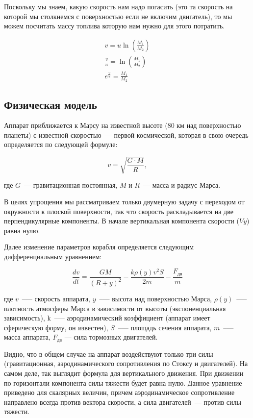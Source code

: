 \documentclass[12pt,a4paper]{article}
\begin{document}
Поскольку мы знаем, какую скорость нам надо погасить (это та скорость на которой мы
столкнемся с поверхностью если не включим двигатель), то мы можем посчитать массу топлива
которую нам нужно для этого потратить.

$$
\begin{array}{c}

  v = u \ln\left(\frac{M_1}{M_2}\right) \\
  \frac{v}{u} = \ln\left(\frac{M_1}{M_2}\right) \\
  e^{\frac{v}{u}} = \frac{M_1}{M_2}
\end{array}
$$

\hfill

\noindent{}

\subsection{Физическая модель}
\label{Sec:Mars-Model}

Аппарат приближается к Марсу на известной высоте (80 км над поверхностью планеты) с
известной скоростью~--- первой космической, которая в свою очередь определяется по следующей
формуле:

$$
v = \sqrt{\frac{G \cdot M}{R}},
$$

где $G$~--- гравитационная постоянная, $M$ и $R$~--- масса и радиус Марса.

В целях упрощения мы рассматриваем только двумерную задачу с переходом от окружности к
плоской поверхности, так что скорость раскладывается на две перпендикулярные компоненты. В
начале вертикальная компонента скорости ($Vy$) равна нулю.

Далее изменение параметров корабля определяется следующим дифференциальным уравнением:

$$
\frac{dv}{dt} = \frac{G M}{(R + y)^2} - \frac{k \rho(y) v^2 S}{2 m} - \frac{F_{\text{дв}}}{m}
$$

где $v$~--— скорость аппарата, $y$~--— высота над поверхностью Марса, $\rho(y)$~--—
плотность атмосферы Марса в зависимости от высоты (экспоненциальная зависимость), k~--—
аэродинамический коэффициент (аппарат имеет сферическую форму, он известен), $S$~--— площадь
сечения аппарата, $m$~--— масса аппарата, $F_{\text{дв}}$ — сила тормозных двигателей.

Видно, что в общем случае на аппарат воздействуют только три силы (гравитационная,
аэродинамического сопротивления по Стоксу и двигателей). На самом деле, так выглядит
формула для вертикального движения. При движении по горизонтали компонента силы тяжести
будет равна нулю. Данное уравнение приведено для скалярных величин, причем
аэродинамическое сопротивление направлено всегда против вектора скорости, а сила
двигателей~--- против силы тяжести.
\end{document}
